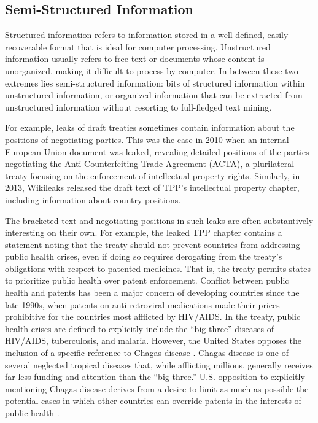 \documentclass[12pt]{article}
\begin{document}
\subsection{Semi-Structured Information}

Structured information refers to information stored in a well-defined, easily recoverable format that 
is ideal for computer processing. Unstructured information usually refers to free text or documents 
whose content is unorganized, making it difficult to process by computer. In between these two extremes 
lies semi-structured information: bits of structured information within unstructured information, 
or organized information that can be extracted from unstructured information without resorting to 
full-fledged text mining.

For example, leaks of draft treaties sometimes contain information about the positions 
of negotiating parties. This was the case in 2010 when an internal European Union document was 
leaked, revealing detailed positions of the parties negotiating the Anti-Counterfeiting 
Trade Agreement (ACTA), a plurilateral treaty focusing on the enforcement of intellectual property 
rights. Similarly, in 2013, Wikileaks released the draft text of TPP's intellectual property chapter, 
including information about country positions.

The bracketed text and negotiating positions in such leaks are often substantively interesting on 
their own. For example, the leaked TPP chapter contains a statement noting that the treaty should 
not prevent countries from addressing public health crises, even if doing so requires derogating from 
the treaty's obligations with respect to patented medicines. That is, the treaty permits states to 
prioritize public health over patent enforcement. Conflict between public health and patents has been 
a major concern of developing countries since the late 1990s, when patents on anti-retroviral medications 
made their prices prohibitive for the countries most afflicted by HIV/AIDS.
In the treaty, public health crises are defined to 
explicitly include the ``big three'' diseases of HIV/AIDS, tuberculosis, and malaria. 
However, the United States opposes the inclusion of a specific reference to Chagas disease \citep[Art. QQ.A.5(a)]{wikileaks2013wikileaks}. 
Chagas disease is one of several neglected tropical diseases that, while afflicting millions, 
generally receives far less funding and attention than the ``big three.'' U.S. opposition to 
explicitly mentioning Chagas disease derives from a desire to limit as much as possible 
the potential cases in which other countries can override patents in the interests of public 
health \citep[11]{government_accountability_office2007intellectual}.
\end{document}
